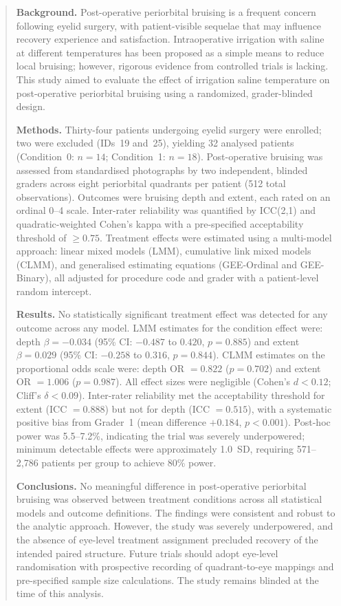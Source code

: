 \begin{abstract}

\noindent\textbf{Background.}
Post-operative periorbital bruising is a frequent concern following eyelid surgery, with patient-visible sequelae that may influence recovery experience and satisfaction. Intraoperative irrigation with saline at different temperatures has been proposed as a simple means to reduce local bruising; however, rigorous evidence from controlled trials is lacking. This study aimed to evaluate the effect of irrigation saline temperature on post-operative periorbital bruising using a randomized, grader-blinded design.

\medskip
\noindent\textbf{Methods.}
Thirty-four patients undergoing eyelid surgery were enrolled; two were excluded (IDs~19 and~25), yielding 32 analysed patients (Condition~0: $n = 14$; Condition~1: $n = 18$). Post-operative bruising was assessed from standardised photographs by two independent, blinded graders across eight periorbital quadrants per patient (512 total observations). Outcomes were bruising depth and extent, each rated on an ordinal 0--4 scale. Inter-rater reliability was quantified by ICC(2,1) and quadratic-weighted Cohen's kappa with a pre-specified acceptability threshold of $\geq 0.75$. Treatment effects were estimated using a multi-model approach: linear mixed models (LMM), cumulative link mixed models (CLMM), and generalised estimating equations (GEE-Ordinal and GEE-Binary), all adjusted for procedure code and grader with a patient-level random intercept.

\medskip
\noindent\textbf{Results.}
No statistically significant treatment effect was detected for any outcome across any model. LMM estimates for the condition effect were: depth $\beta = -0.034$ (95\% CI: $-0.487$ to $0.420$, $p = 0.885$) and extent $\beta = 0.029$ (95\% CI: $-0.258$ to $0.316$, $p = 0.844$). CLMM estimates on the proportional odds scale were: depth OR $= 0.822$ ($p = 0.702$) and extent OR $= 1.006$ ($p = 0.987$). All effect sizes were negligible (Cohen's $d < 0.12$; Cliff's $\delta < 0.09$). Inter-rater reliability met the acceptability threshold for extent (ICC $= 0.888$) but not for depth (ICC $= 0.515$), with a systematic positive bias from Grader~1 (mean difference $+0.184$, $p < 0.001$). Post-hoc power was 5.5--7.2\%, indicating the trial was severely underpowered; minimum detectable effects were approximately 1.0~SD, requiring 571--2{,}786 patients per group to achieve 80\% power.

\medskip
\noindent\textbf{Conclusions.}
No meaningful difference in post-operative periorbital bruising was observed between treatment conditions across all statistical models and outcome definitions. The findings were consistent and robust to the analytic approach. However, the study was severely underpowered, and the absence of eye-level treatment assignment precluded recovery of the intended paired structure. Future trials should adopt eye-level randomisation with prospective recording of quadrant-to-eye mappings and pre-specified sample size calculations. The study remains blinded at the time of this analysis.

\end{abstract}
